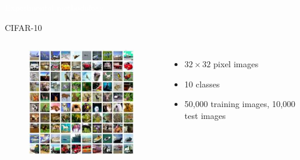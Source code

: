 \documentclass[xcolor=dvipsnames]{beamer}
\begin{document}
{
\begin{frame}
    \centering
    \textcolor{white}{\LARGE Experimental methodology}
\end{frame}
}



\begin{frame}{CIFAR-10}

\begin{columns}
\begin{figure}
    \centering
    \includegraphics[width=\textwidth]{images/cifar.jpg}
\end{figure}


\begin{itemize}
    \item $32 \times 32$ pixel images
    \item 10 classes
    \item 50,000 training images, 10,000 test images
\end{itemize}

\end{columns}
\end{frame}
\end{document}
